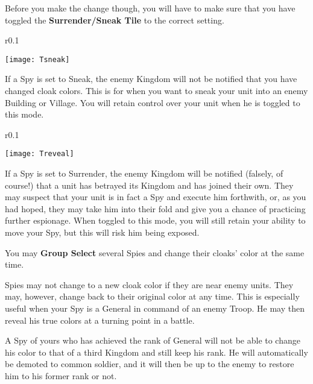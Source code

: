 Before you make the change though, you will have to make sure that you have toggled the \textbf{Surrender/Sneak Tile} to the correct setting.

\begin{wrapfigure}{r}{0.1\textwidth}
    \vspace{-20pt}
    \begin{center}
        \texttt{[image: Tsneak]}
    \end{center}
    \vspace{-10pt}
\end{wrapfigure}

If a Spy is set to Sneak, the enemy Kingdom will not be notified that you have changed cloak colors. This is for when you want to sneak your unit into an enemy Building or Village. You will retain control over your unit when he is toggled to this mode.

\begin{wrapfigure}{r}{0.1\textwidth}
    \vspace{-20pt}
    \begin{center}
        \texttt{[image: Treveal]}
    \end{center}
    \vspace{-20pt}
\end{wrapfigure}

If a Spy is set to Surrender, the enemy Kingdom will be notified (falsely, of course!) that a unit has betrayed its Kingdom and has joined their own. They may suspect that your unit is in fact a Spy and execute him forthwith, or, as you had hoped, they may take him into their fold and give you a chance of practicing further espionage. When toggled to this mode, you will still retain your ability to move your Spy, but this will risk him being exposed.

You may \textbf{Group Select} several Spies and change their cloaks’ color at the same time.

Spies may not change to a new cloak color if they are near enemy units. They may, however, change back to their original color at any time. This is especially useful when your Spy is a General in command of an enemy Troop. He may then reveal his true colors at a turning point in a battle.

A Spy of yours who has achieved the rank of General will not be able to change his color to that of a third Kingdom and still keep his rank. He will automatically be demoted to common soldier, and it will then be up to the enemy to restore him to his former rank or not.

